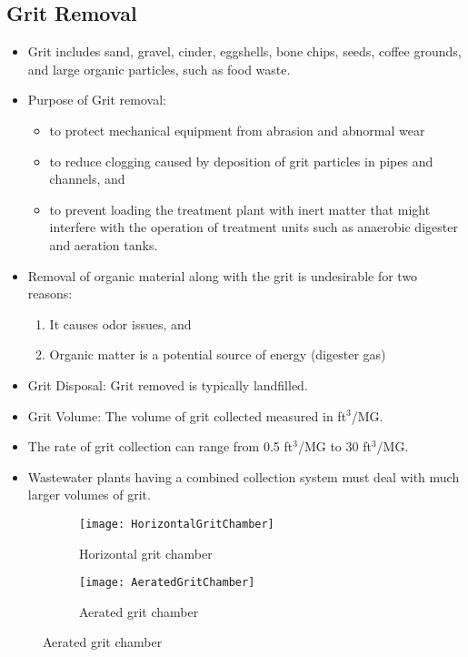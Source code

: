 		\subsection{Grit Removal}
						\begin{itemize}
							\item Grit includes sand, gravel, cinder, eggshells, bone chips, seeds, coffee grounds, and large organic particles, such as food waste.
							\item Purpose of Grit removal:
								\begin{itemize} 
									\item to protect mechanical equipment from abrasion and abnormal wear 
									\item to reduce clogging caused by deposition of grit particles in pipes and channels, and 
				\item to prevent loading the treatment plant with inert matter that might interfere with the operation of treatment units such as anaerobic digester and aeration tanks.
			\end{itemize}
		\item Removal of organic material along with the grit is undesirable for two reasons:
			\begin{enumerate}
				\item It causes odor issues, and 
				\item Organic matter is a potential source of energy (digester gas)
			\end{enumerate}
		\item Grit Disposal: Grit removed is typically landfilled.
		\item Grit Volume:  The volume of grit collected measured in ft$^3$/MG.
		\item The rate of grit collection can range from 0.5 ft$^3$/MG to 30 ft$^3$/MG.
		\item Wastewater plants having a combined collection system must deal with much larger volumes of grit.
\end{itemize}

\begin{figure}[h!]
  \centering
  \begin{subfigure}[b]{0.46\linewidth}
    \texttt{[image: HorizontalGritChamber]}
    \caption{Horizontal grit chamber}
  \end{subfigure}
  \hspace{0.2cm}
  \begin{subfigure}[b]{0.5\linewidth}
    \texttt{[image: AeratedGritChamber]}
    \caption{Aerated grit chamber}
  \end{subfigure}
\end{figure} 					

